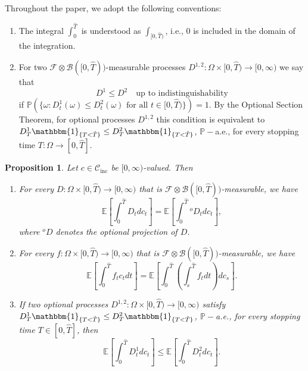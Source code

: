 \documentclass[11pt, oneside]{article}   	%
\theoremstyle{plain}
\newtheorem{prop}[thm]{Proposition}
\theoremstyle{definition}
\theoremstyle{remark}
\begin{document}
Throughout the paper, we adopt the following conventions:
\begin{enumerate}
\item The integral $\int_0^{\hat{T}}$ is understood as $\int_{[0,\hat{T})}$, i.e., $0$ is included in the domain of the integration.
\item For two $\mathcal{F}\otimes\mathcal{B}([0,\hat{T}))$-measurable processes $D^{1,2}:\Omega\times[0,\hat{T})\to[0,\infty)$ we say that $$D^1\leq D^2\quad \text{up to indistinguishability}$$
if $\mathbb{P}\left(\{\omega: D^1_t(\omega)\leq D^2_t(\omega)\text{ for all }t\in[0,\hat{T})\}\right)=1$. By the Optional Section Theorem, for optional processes $D^{1,2}$ this condition is equivalent to
$D^1_T\mathbbm{1}_{\{T<\hat{T}\}}\leq D^2_T\mathbbm{1}_{\{T<\hat{T}\}}$, $\mathbb{P}-$a.e., for every stopping time $T:\Omega\to[0,\hat{T}]$.
 \end{enumerate}
\begin{prop}
Let $c\in\mathcal{C}_{\text{inc}}$ be $[0,\infty)$-valued. Then
\begin{enumerate}
\item For every $D:\Omega\times[0,\hat{T})\to[0,\infty)$ that is $\mathcal{F}\otimes\mathcal{B}([0,\hat{T}))$-measurable, we have
\begin{equation}\label{eq:int-optional-proj}
\mathbb{E}\left[\int_0^{\hat{T}} D_tdc_t\right]=\mathbb{E}\left[\int_0^{\hat{T}}{}^oD_tdc_t\right],
\end{equation}
where ${}^oD$ denotes the optional projection of $D$.
\item For every $f:\Omega\times[0,\hat{T})\to[0,\infty)$ that is $\mathcal{F}\otimes\mathcal{B}([0,{\hat{T}}))$-measurable, we have
\begin{equation}\label{eq:IBP}
\mathbb{E}\left[\int_0^{\hat{T}} f_t c_t dt\right]=\mathbb{E}\left[\int_0^{\hat{T}} \left(\int_s^{\hat{T}} f_tdt\right)dc_s\right].
\end{equation}
\item If two optional processes $D^{1,2}:\Omega\times[0,{\hat{T}})\to[0,\infty)$ satisfy $D^1_T\mathbbm{1}_{\{T<\hat{T}\}}\leq D^2_T\mathbbm{1}_{\{T<\hat{T}\}}$, $\mathbb{P}-$a.e., for every stopping time $T\in[0,\hat{T}]$, then
\begin{equation}\label{eq:comparison-for-int}
\mathbb{E}\left[\int_0^{\hat{T}} D^1_tdc_t\right]\leq\mathbb{E}\left[\int_0^{\hat{T}} D^2_tdc_t\right].
\end{equation}
\end{enumerate}
\end{prop}
\end{document}
